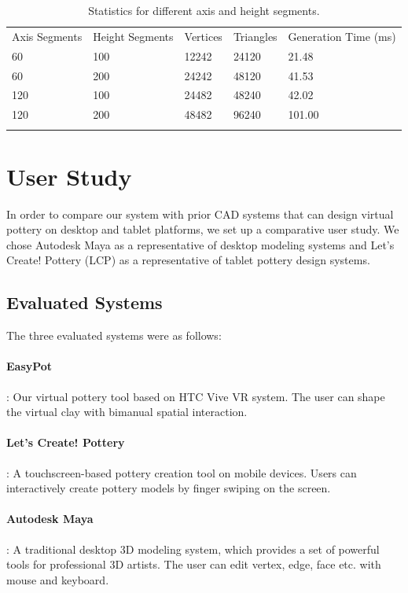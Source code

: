 \documentclass{svjour3}                     %
\begin{document}
\begin{table}
\caption{Statistics for different axis and height segments.}
\label{tab:2}       %
\begin{tabular}{lllll}
\hline\noalign{\smallskip}
Axis Segments & Height Segments & Vertices & Triangles & Generation Time (ms)\\
\noalign{\smallskip}\hline\noalign{\smallskip}
60 & 100 & 12242 & 24120 & 21.48 \\
60 & 200 & 24242 & 48120 & 41.53 \\
120 & 100 & 24482 & 48240 & 42.02 \\
120 & 200 & 48482 & 96240 & 101.00 \\
\noalign{\smallskip}\hline
\end{tabular}
\end{table}

\section{User Study}
\label{sec:6}
In order to compare our system with prior CAD systems that can design virtual pottery on desktop and tablet platforms, we set up a comparative user study. We chose Autodesk Maya \cite{website:maya} as a representative of desktop modeling systems and Let's Create! Pottery (LCP) \cite{website:letspottery} as a representative of tablet pottery design systems.


\subsection{Evaluated Systems}
\label{sec:6.1}
The three evaluated systems were as follows:

\paragraph{EasyPot}: Our virtual pottery tool based on HTC Vive VR system. The user can shape the virtual clay with bimanual spatial interaction.
\paragraph{Let’s Create! Pottery}: A touchscreen-based pottery creation tool on mobile devices. Users can interactively create pottery models by finger swiping on the screen.
\paragraph{Autodesk Maya}: A traditional desktop 3D modeling system, which provides a set of powerful tools for professional 3D artists. The user can edit vertex, edge, face etc. with mouse and keyboard.
\end{document}
